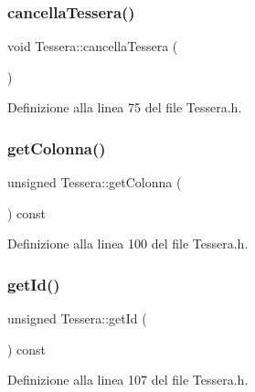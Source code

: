\subsubsection{\texorpdfstring{cancella\+Tessera()}{cancellaTessera()}}
{\footnotesize\ttfamily void Tessera\+::cancella\+Tessera (\begin{DoxyParamCaption}{ }\end{DoxyParamCaption})\hspace{0.3cm}{\ttfamily [inline]}}



Definizione alla linea 75 del file Tessera.\+h.

\mbox{\label{class_tessera_a8bb284ce7ae9a1cbbf2a3680e271f2e2}} 
\subsubsection{\texorpdfstring{get\+Colonna()}{getColonna()}}
{\footnotesize\ttfamily unsigned Tessera\+::get\+Colonna (\begin{DoxyParamCaption}{ }\end{DoxyParamCaption}) const\hspace{0.3cm}{\ttfamily [inline]}}



Definizione alla linea 100 del file Tessera.\+h.

\mbox{\label{class_tessera_aec15746212813b92a24df30fc570a331}} 
\subsubsection{\texorpdfstring{get\+Id()}{getId()}}
{\footnotesize\ttfamily unsigned Tessera\+::get\+Id (\begin{DoxyParamCaption}{ }\end{DoxyParamCaption}) const\hspace{0.3cm}{\ttfamily [inline]}}



Definizione alla linea 107 del file Tessera.\+h.

\mbox{\label{class_tessera_a5ddf2120b4dcf1d208b43ade0ff4a02f}} 
